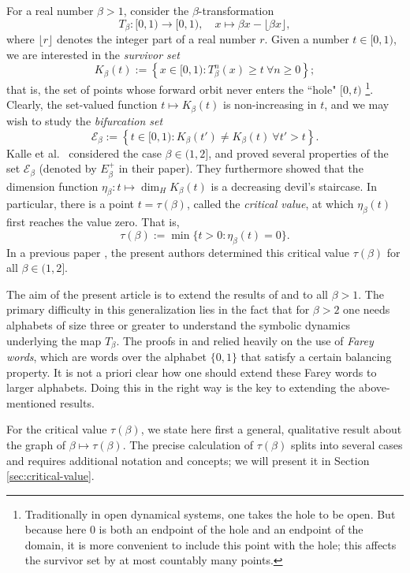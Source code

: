 \documentclass[12pt]{amsart}
\theoremstyle{definition}
\theoremstyle{remark}
\numberwithin{equation}{section}
\newcommand{\E}{\mathscr{E}}
\newcommand{\set}[1]{\left\{#1\right\}}
\begin{document}
For a real number $\beta>1$, consider the $\beta$-transformation
\[
T_\beta: [0,1)\to[0,1), \quad x\mapsto\beta x-\lfloor \beta x\rfloor,
\]
where $\lfloor r\rfloor$ denotes the integer part of a real number $r$.
Given a number $t\in[0,1)$, we are interested in the {\em survivor set}
\[
K_\beta(t):=\set{x\in[0,1): T_\beta^n (x)\ge t\ \forall n\ge 0};
\]
that is, the set of points whose forward orbit never enters the ``hole" $[0,t)$ \footnote{Traditionally in open dynamical systems, one takes the hole to be open. But because here $0$ is both an endpoint of the hole and an endpoint of the domain, it is more convenient to include this point with the hole; this affects the survivor set by at most countably many points.}.
Clearly, the set-valued function $t\mapsto K_\beta(t)$ is non-increasing in $t$, and we may wish to study the {\em bifurcation set}
\begin{equation} \label{eq:bifurcation-set}
\E_\beta:=\set{t\in[0,1): K_\beta(t')\ne K_\beta(t)~\forall t'>t}.
\end{equation}
Kalle et al.~\cite{Kalle-Kong-Langeveld-Li-18} considered the case $\beta\in(1,2]$, and proved several properties of the set $\E_\beta$ (denoted by $E_\beta^+$ in their paper). They furthermore showed that the dimension function $\eta_\beta: t\mapsto \dim_H K_\beta(t)$ is a decreasing devil's staircase. In particular, there is a point $t=\tau(\beta)$, called the {\em critical value}, at which $\eta_\beta(t)$ first reaches the value zero. That is,
\[
\tau(\beta):=\min\{t>0: \eta_\beta(t)=0\}.
\]
In a previous paper \cite{Allaart-Kong-2021}, the present authors determined this critical value $\tau(\beta)$ for all $\beta\in(1,2]$.

The aim of the present article is to extend the results of \cite{Kalle-Kong-Langeveld-Li-18} and \cite{Allaart-Kong-2021} to all $\beta>1$. The primary difficulty in this generalization lies in the fact that for $\beta>2$ one needs alphabets of size three or greater to understand the symbolic dynamics underlying the map $T_\beta$. The proofs in \cite{Kalle-Kong-Langeveld-Li-18} and \cite{Allaart-Kong-2021} relied heavily on the use of {\em Farey words}, which are words over the alphabet $\{0,1\}$ that satisfy a certain balancing property. It is not a priori clear how one should extend these Farey words to larger alphabets. Doing this in the right way is the key to extending the above-mentioned results.

For the critical value $\tau(\beta)$, we state here first a general, qualitative result about the graph of $\beta\mapsto\tau(\beta)$. The precise calculation of $\tau(\beta)$ splits into several cases and requires additional notation and concepts; we will present it in Section \ref{sec:critical-value}.
\end{document}
